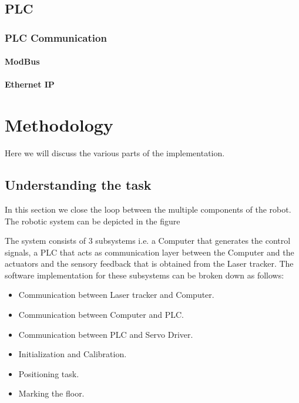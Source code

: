 \documentclass{LTHthesis}
\begin{document}
    \section{PLC}

        \subsection{PLC Communication}
            \subsubsection{ModBus} \label{modbus}
            \subsubsection{Ethernet IP} \label{ethernetip}
\chapter{Methodology}
    Here we will discuss the various parts of the implementation.
    \section{Understanding the task}
    In this section we close the loop between the multiple components of the robot. The robotic system can be depicted in the figure 

    The system consists of 3 subsystems i.e. a Computer that generates the control signals, a PLC that acts as communication layer between the Computer and the actuators and the sensory feedback that is obtained from the Laser tracker. The software implementation for these subsystems can be broken down as follows:
    \begin{itemize}
        \item Communication between Laser tracker and Computer.
        \item Communication between Computer and PLC.
        \item Communication between PLC and Servo Driver.
        \item Initialization and Calibration.
        \item Positioning task.
        \item Marking the floor.
    \end{itemize}
\end{document}
